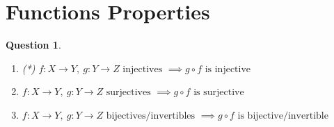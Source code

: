 \documentclass[]{article}
\newtheorem{question}{Question}
\begin{document}
\section{Functions Properties}
\begin{question}
	\begin{enumerate}[label=\alph*.]
		\item (*) $f: X \to Y, \ g: Y \to Z \text{ injectives } \implies g \circ f \text{ is injective}$\\
		\item $f: X \to Y, \ g: Y \to Z \text{ surjectives } \implies g \circ f \text{ is surjective}$\\
		\item $f: X \to Y, \ g: Y \to Z \text{ bijectives/invertibles } \implies g \circ f \text{ is bijective/invertible}$
	\end{enumerate}
\end{question}
\end{document}
